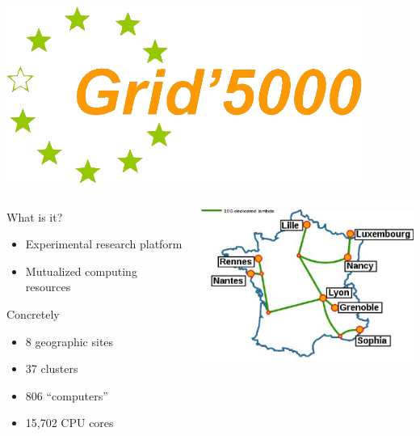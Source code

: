 \documentclass[10pt]{beamer}
\begin{document}
\begin{frame}[label=tme]
  \includegraphics{grid5000_logo.png}

  \begin{columns}
    \begin{column}{5cm}

      \begin{exampleblock}{What is it?}
        \begin{itemize}
        \item Experimental research platform 
        \item Mutualized computing resources
        \end{itemize}
      \end{exampleblock}
      
      \begin{block}{Concretely}
        \begin{itemize}
        \item 8 geographic sites
        \item 37 clusters
        \item 806 ``computers''
        \item 15,702 CPU cores
        \end{itemize}
      \end{block}

      
    \end{column}
    \begin{column}{7cm}
      \includegraphics[width=7cm]{grid5000.pdf}
    \end{column}
  \end{columns}
\end{frame}
\end{document}
